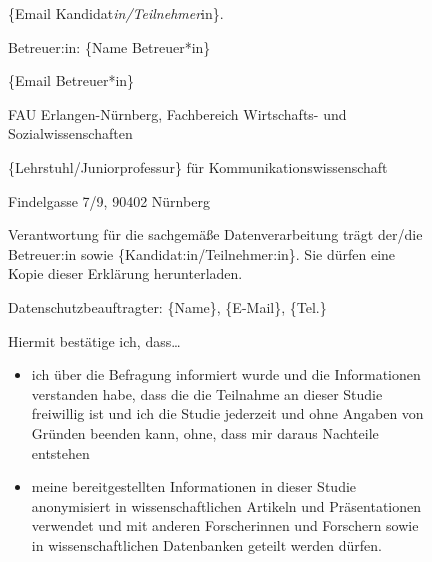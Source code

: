 \documentclass[
  letterpaper,
  DIV=11]{scrreprt}
\begin{document}
\begin{figure}
\hspace{0pt}\hspace{0pt}\{Email
Kandidat\emph{in/Teilnehmer}in\}.\hspace{0pt}

\hspace{0pt}\hspace{0pt}Betreuer:in:\hspace{0pt} \{Name Betreuer*in\}

\hspace{0pt}\hspace{0pt}\{Email Betreuer*in\}

\hspace{0pt}\hspace{0pt}\hspace{0pt}FAU Erlangen-Nürnberg, Fachbereich
Wirtschafts- und Sozialwissenschaften\hspace{0pt}\hspace{0pt}

\{Lehrstuhl/\hspace{0pt}\hspace{0pt}Juniorprofessur\} für
Kommunikationswissenschaft\hspace{0pt}

\hspace{0pt}\hspace{0pt}Findelgasse 7/9, 90402 Nürnberg\hspace{0pt}

Verantwortung für die sachgemäße Datenverarbeitung trägt der/die
Betreuer:in sowie
\hspace{0pt}\hspace{0pt}\{Kandidat:in/Teilnehmer:in\}\hspace{0pt}\hspace{0pt}.
Sie dürfen eine Kopie dieser Erklärung herunterladen.

Datenschutzbeauftragter: \{Name\}, \{E-Mail\}, \{Tel.\}

Hiermit bestätige ich, dass\ldots{}

\begin{itemize}
\item
  ich über die Befragung informiert wurde und die Informationen
  verstanden habe, dass die die Teilnahme an dieser Studie freiwillig
  ist und ich die Studie jederzeit und ohne Angaben von Gründen beenden
  kann, ohne, dass mir daraus Nachteile entstehen
\item
  meine bereitgestellten Informationen in dieser Studie
  \hspace{0pt}anonymisiert in wissenschaftlichen Artikeln und
  Präsentationen verwendet und mit anderen Forscherinnen und Forschern
  sowie in wissenschaftlichen Datenbanken \hspace{0pt} geteilt werden
  dürfen.
\end{itemize}


\end{figure}
\end{document}
